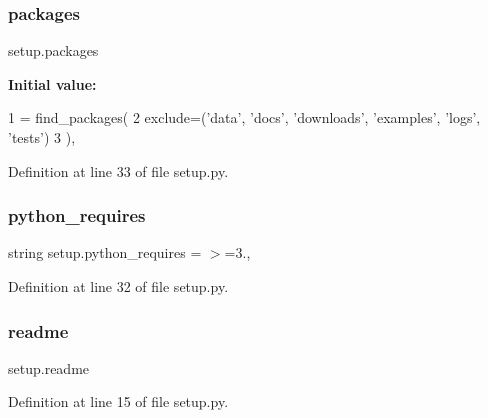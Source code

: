 \mbox{\label{namespacesetup_aff2375a361fd5865c77bd9aa093be747}} 
\subsubsection{\texorpdfstring{packages}{packages}}
{\footnotesize\ttfamily setup.\+packages}

{\bfseries Initial value\+:}
\begin{DoxyCode}
1 = find\_packages(
2             exclude=(\textcolor{stringliteral}{'data'}, \textcolor{stringliteral}{'docs'}, \textcolor{stringliteral}{'downloads'}, \textcolor{stringliteral}{'examples'}, \textcolor{stringliteral}{'logs'}, \textcolor{stringliteral}{'tests'})
3         ),
\end{DoxyCode}


Definition at line 33 of file setup.\+py.

\mbox{\label{namespacesetup_a706f18c98c7818145eb58deff3eca806}} 
\subsubsection{\texorpdfstring{python\+\_\+requires}{python\_requires}}
{\footnotesize\ttfamily string setup.\+python\+\_\+requires = \textquotesingle{}$>$=3.\textquotesingle{},}



Definition at line 32 of file setup.\+py.

\mbox{\label{namespacesetup_af307481f158da7b58a33229df5e30c6c}} 
\subsubsection{\texorpdfstring{readme}{readme}}
{\footnotesize\ttfamily setup.\+readme}



Definition at line 15 of file setup.\+py.

\mbox{\label{namespacesetup_a0c29631fa586cf133cd55999a817f46b}} 
